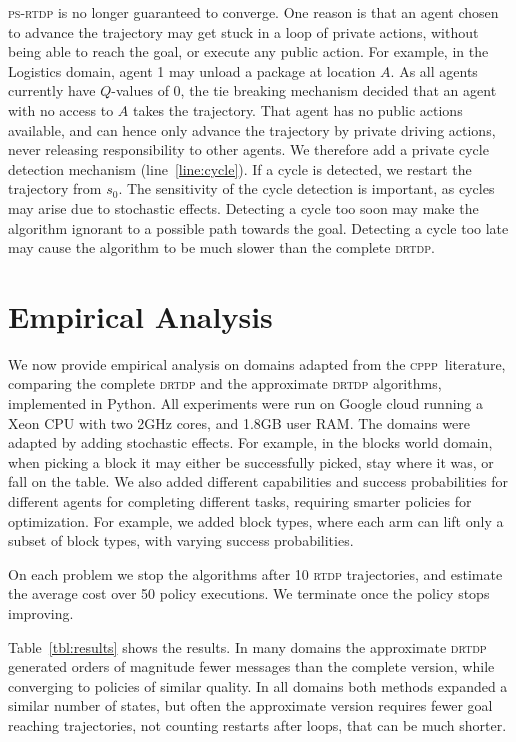 \documentclass[letterpaper]{article} %
\newcommand{\cppp}{\textsc {cppp}\xspace}
\newcommand{\rtdp}{\textsc {rtdp}\xspace}
\newcommand{\drtdp}{\textsc {drtdp}\xspace}
\newcommand{\psrtdp}{\textsc{ps}-\textsc{rtdp}\xspace}
\theoremstyle{remark}
\begin{document}
\psrtdp is no longer guaranteed to converge. One reason is that an agent chosen to advance the trajectory may get stuck in a loop of private actions, without being able to reach the goal, or execute any public action. For example, in the Logistics domain, agent 1 may unload a package at location $A$. As all agents currently have  $Q$-values of 0, the tie breaking mechanism decided that an agent with no access to $A$ takes the trajectory. That agent has no public actions available, and can hence only advance the trajectory by private driving actions, never releasing responsibility to other agents.
We therefore add a private cycle detection mechanism (line~\ref{line:cycle}). If a cycle is detected, we restart the trajectory from $s_0$. The sensitivity of the cycle detection is important, as cycles may arise due to stochastic effects. Detecting a cycle too soon may make the algorithm ignorant to a possible path towards the goal. Detecting a cycle too late may cause the algorithm to be much slower than the complete \drtdp.


\section{Empirical Analysis}



We now provide empirical analysis on domains adapted from the \cppp\ literature, comparing the complete \drtdp and the approximate \drtdp algorithms, implemented in Python. All experiments were run on Google cloud running a Xeon CPU with two 2GHz cores, and 1.8GB user RAM.
The domains were adapted by adding stochastic effects. For example, in the blocks world domain, when picking a block it may either be successfully picked, stay where it was, or fall on the table. We also added different capabilities and success probabilities for different agents for completing different tasks, requiring smarter policies for optimization. For example, we added block types, where each arm can lift only a subset of block types, with varying success probabilities.

On each problem we stop the algorithms after 10 \rtdp trajectories, and estimate the average cost over 50 policy executions. We terminate once the policy stops improving.

Table~\ref{tbl:results} shows the results. In many domains the approximate \drtdp generated orders of magnitude fewer messages than the complete version, while converging to policies of similar quality. In all domains both methods expanded a similar number of states, but often the approximate version requires fewer goal reaching trajectories, not counting restarts after loops, that can be much shorter.
\end{document}
